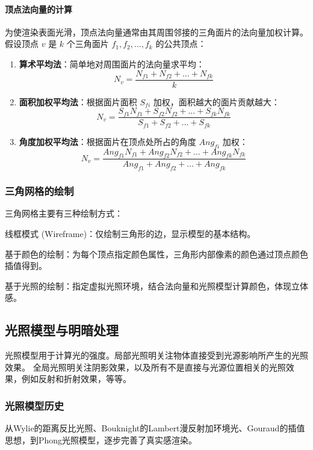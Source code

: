 \documentclass[12pt]{article}
\begin{document}
\paragraph{顶点法向量的计算}
为使渲染表面光滑，顶点法向量通常由其周围邻接的三角面片的法向量加权计算。假设顶点 $v$ 是 $k$ 个三角面片 $f_1, f_2, \dots, f_k$ 的公共顶点：

\begin{enumerate}[label=\textbf{\arabic*.}]
    \item \textbf{算术平均法}：简单地对周围面片的法向量求平均：
    \[
    N_v = \frac{N_{f1} + N_{f2} + \dots + N_{fk}}{k}
    \]
    
    \item \textbf{面积加权平均法}：根据面片面积 $S_{fi}$ 加权，面积越大的面片贡献越大：
    \[
    N_v = \frac{S_{f1}N_{f1} + S_{f2}N_{f2} + \dots + S_{fk}N_{fk}}{S_{f1} + S_{f2} + \dots + S_{fk}}
    \]
    
    \item \textbf{角度加权平均法}：根据面片在顶点处所占的角度 $Ang_{fi}$ 加权：
    \[
    N_v = \frac{Ang_{f1}N_{f1} + Ang_{f2}N_{f2} + \dots + Ang_{fk}N_{fk}}{Ang_{f1} + Ang_{f2} + \dots + Ang_{fk}}
    \]
\end{enumerate}

\subsubsection{三角网格的绘制}

三角网格主要有三种绘制方式：

线框模式 (Wireframe)：仅绘制三角形的边，显示模型的基本结构。

基于颜色的绘制：为每个顶点指定颜色属性，三角形内部像素的颜色通过顶点颜色插值得到。

基于光照的绘制：指定虚拟光照环境，结合法向量和光照模型计算颜色，体现立体感。

\subsection{光照模型与明暗处理}

光照模型用于计算光的强度。局部光照明关注物体直接受到光源影响所产生的光照效果。
全局光照明关注阴影效果，以及所有不是直接与光源位置相关的光照效果，例如反射和折射效果，等等。

\subsubsection{光照模型历史}
从Wylie的距离反比光照、Bouknight的Lambert漫反射加环境光、Gouraud的插值思想，到Phong光照模型，逐步完善了真实感渲染。
\end{document}
